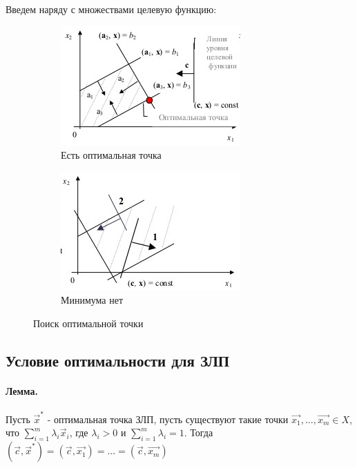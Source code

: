 \documentclass[a4paper, 14pt]{extarticle}
\numberwithin{equation}{section}
\begin{document}
Введем наряду с множествами целевую функцию:
\begin{figure}[h]
	\centering
	\begin{subfigure}[b]{0.45\textwidth}
		\centering
		\includegraphics[width=\textwidth]{img/S003.jpg}
		\caption{Есть оптимальная точка}
	\end{subfigure}
	\begin{subfigure}[b]{0.45\textwidth}
		\centering
		\includegraphics[width=\textwidth]{img/S004.jpg}
		\caption{Минимума нет}
	\end{subfigure}
	\caption{Поиск оптимальной точки}
\end{figure}

\subsection{Условие оптимальности для ЗЛП}
\paragraph{Лемма.} Пусть $\vec{x}^*$ - оптимальная точка ЗЛП, пусть существуют такие точки $\vec{x_1}, ..., \vec{x_m} \in X$, что $ \sum\limits_{i=1}^m \lambda_i \vec{x}_i $, где $\lambda_i > 0$ и $ \sum\limits_{i=1}^m \lambda_i = 1$. Тогда $(\vec{c}, \vec{x}^*) = (\vec{c}, \vec{x_1}) = ... = (\vec{c}, \vec{x_m})$
\end{document}
